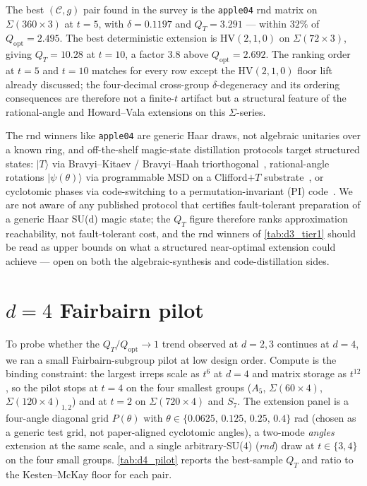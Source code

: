 \documentclass[twocolumn,superscriptaddress,showpacs,nofootinbib,notitlepage,preprintnumbers,secnumarabic,amssymb, nobibnotes, aps, prd]{revtex4-2}
\newcommand{\QT}{Q_{T}}              %
\newcommand{\Popt}{Q_{\mathrm{opt}}} %
\newcommand{\HV}[3]{\mathrm{HV}(#1,#2,#3)} %
\newcommand{\Sigmathree}[1]{\Sigma(#1\!\times\!3)} %
\begin{document}
The best $(\mathcal{C},g)$ pair found in the survey is the \texttt{apple04} rnd matrix on $\Sigmathree{360}$ at $t=5$, with $\delta = 0.1197$ and $\QT = 3.291$ --- within $32\%$ of $\Popt = 2.495$. The best deterministic extension is $\HV{2}{1}{0}$ on $\Sigmathree{72}$, giving $\QT = 10.28$ at $t=10$, a factor $3.8$ above $\Popt = 2.692$. The ranking order at $t=5$ and $t=10$ matches for every row except the $\HV{2}{1}{0}$ floor lift already discussed; the four-decimal cross-group $\delta$-degeneracy and its ordering consequences are therefore not a finite-$t$ artifact but a structural feature of the rational-angle and Howard--Vala extensions on this $\Sigma$-series.

The rnd winners like \texttt{apple04} are generic Haar draws, not algebraic unitaries over a known ring, and off-the-shelf magic-state distillation protocols target structured states: $|T\rangle$ via Bravyi--Kitaev / Bravyi--Haah triorthogonal~\cite{Bravyi:2004isx,Bravyi:2012czv}, rational-angle rotations $|\psi(\theta)\rangle$ via programmable MSD on a Clifford$+T$ substrate~\cite{DuclosCianciPoulin:2015,CampbellOGorman:2016,CampbellHoward:2017}, or cyclotomic phases via code-switching to a permutation-invariant (PI) code~\cite{OuyangJingBrennen:2024}. We are not aware of any published protocol that certifies fault-tolerant preparation of a generic Haar SU(d) magic state; the $\QT$ figure therefore ranks approximation reachability, not fault-tolerant cost, and the rnd winners of \cref{tab:d3_tier1} should be read as upper bounds on what a structured near-optimal extension could achieve --- open on both the algebraic-synthesis and code-distillation sides.

\section{$d=4$ Fairbairn pilot}\label{sec:d4}

To probe whether the $\QT/\Popt \to 1$ trend observed at $d=2,3$ continues at $d=4$, we ran a small Fairbairn-subgroup pilot at low design order. Compute is the binding constraint: the largest irreps scale as $t^6$ at $d=4$ and matrix storage as $t^{12}$, so the pilot stops at $t=4$ on the four smallest groups ($A_5$, $\Sigma(60{\times}4)$, $\Sigma(120{\times}4)_{1,2}$) and at $t=2$ on $\Sigma(720{\times}4)$ and $S_7$. The extension panel is a four-angle diagonal grid $P(\theta)$ with $\theta\in\{0.0625,\,0.125,\,0.25,\,0.4\}$ rad (chosen as a generic test grid, not paper-aligned cyclotomic angles), a two-mode \emph{angles} extension at the same scale, and a single arbitrary-SU(4) (\emph{rnd}) draw at $t\in\{3,4\}$ on the four small groups. \cref{tab:d4_pilot} reports the best-sample $\QT$ and ratio to the Kesten--McKay floor for each pair.
\end{document}
